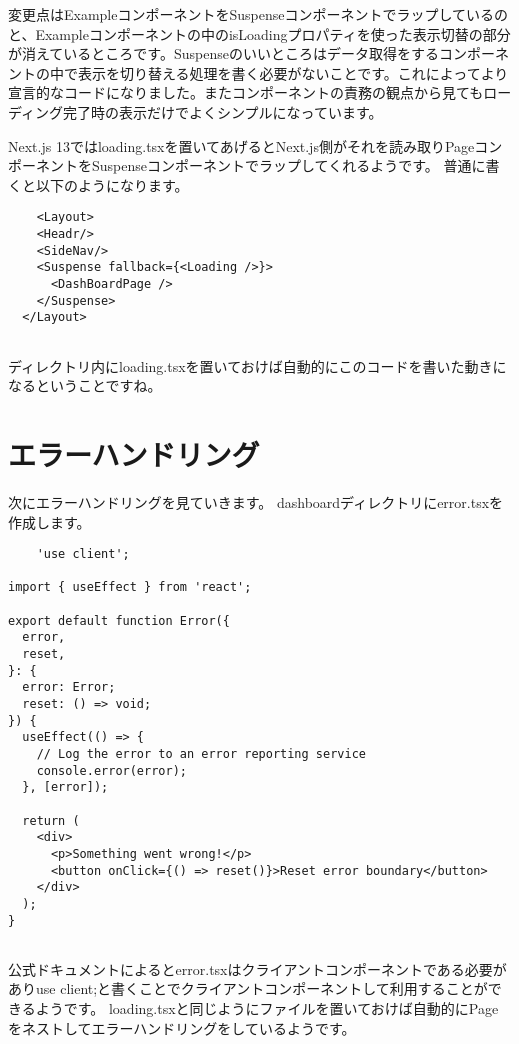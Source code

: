 変更点はExampleコンポーネントをSuspenseコンポーネントでラップしているのと、Exampleコンポーネントの中のisLoadingプロパティを使った表示切替の部分が消えているところです。Suspenseのいいところはデータ取得をするコンポーネントの中で表示を切り替える処理を書く必要がないことです。これによってより宣言的なコードになりました。またコンポーネントの責務の観点から見てもローディング完了時の表示だけでよくシンプルになっています。

Next.js 13ではloading.tsxを置いてあげるとNext.js側がそれを読み取りPageコンポーネントをSuspenseコンポーネントでラップしてくれるようです。
普通に書くと以下のようになります。

\begin{tcolorbox}[breakable]
  \begin{verbatim}
    <Layout>
    <Headr/>
    <SideNav/>
    <Suspense fallback={<Loading />}>
      <DashBoardPage />
    </Suspense>
  </Layout>
    
  \end{verbatim}
\end{tcolorbox}
ディレクトリ内にloading.tsxを置いておけば自動的にこのコードを書いた動きになるということですね。


\section{エラーハンドリング}

次にエラーハンドリングを見ていきます。
dashboardディレクトリにerror.tsxを作成します。




\begin{tcolorbox}[breakable]
  \begin{verbatim}
    'use client';

import { useEffect } from 'react';

export default function Error({
  error,
  reset,
}: {
  error: Error;
  reset: () => void;
}) {
  useEffect(() => {
    // Log the error to an error reporting service
    console.error(error);
  }, [error]);

  return (
    <div>
      <p>Something went wrong!</p>
      <button onClick={() => reset()}>Reset error boundary</button>
    </div>
  );
}
    
  \end{verbatim}
\end{tcolorbox}



公式ドキュメントによるとerror.tsxはクライアントコンポーネントである必要がありuse client;と書くことでクライアントコンポーネントして利用することができるようです。
loading.tsxと同じようにファイルを置いておけば自動的にPageをネストしてエラーハンドリングをしているようです。

